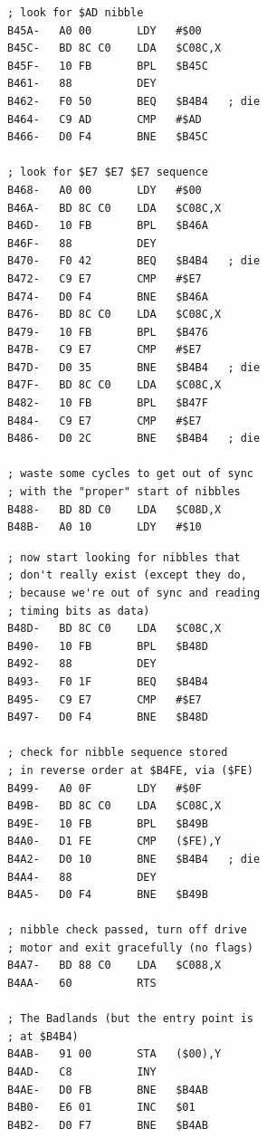 \documentclass{article}
\begin{document}
\begin{verbatim}
; look for $AD nibble
B45A-   A0 00       LDY   #$00
B45C-   BD 8C C0    LDA   $C08C,X
B45F-   10 FB       BPL   $B45C
B461-   88          DEY
B462-   F0 50       BEQ   $B4B4   ; die
B464-   C9 AD       CMP   #$AD
B466-   D0 F4       BNE   $B45C

; look for $E7 $E7 $E7 sequence
B468-   A0 00       LDY   #$00
B46A-   BD 8C C0    LDA   $C08C,X
B46D-   10 FB       BPL   $B46A
B46F-   88          DEY
B470-   F0 42       BEQ   $B4B4   ; die
B472-   C9 E7       CMP   #$E7
B474-   D0 F4       BNE   $B46A
B476-   BD 8C C0    LDA   $C08C,X
B479-   10 FB       BPL   $B476
B47B-   C9 E7       CMP   #$E7
B47D-   D0 35       BNE   $B4B4   ; die
B47F-   BD 8C C0    LDA   $C08C,X
B482-   10 FB       BPL   $B47F
B484-   C9 E7       CMP   #$E7
B486-   D0 2C       BNE   $B4B4   ; die

; waste some cycles to get out of sync
; with the "proper" start of nibbles
B488-   BD 8D C0    LDA   $C08D,X
B48B-   A0 10       LDY   #$10
\end{verbatim}

\newpage

\begin{verbatim}
; now start looking for nibbles that
; don't really exist (except they do,
; because we're out of sync and reading
; timing bits as data)
B48D-   BD 8C C0    LDA   $C08C,X
B490-   10 FB       BPL   $B48D
B492-   88          DEY
B493-   F0 1F       BEQ   $B4B4
B495-   C9 E7       CMP   #$E7
B497-   D0 F4       BNE   $B48D

; check for nibble sequence stored
; in reverse order at $B4FE, via ($FE)
B499-   A0 0F       LDY   #$0F
B49B-   BD 8C C0    LDA   $C08C,X
B49E-   10 FB       BPL   $B49B
B4A0-   D1 FE       CMP   ($FE),Y
B4A2-   D0 10       BNE   $B4B4   ; die
B4A4-   88          DEY
B4A5-   D0 F4       BNE   $B49B

; nibble check passed, turn off drive
; motor and exit gracefully (no flags)
B4A7-   BD 88 C0    LDA   $C088,X
B4AA-   60          RTS

; The Badlands (but the entry point is
; at $B4B4)
B4AB-   91 00       STA   ($00),Y
B4AD-   C8          INY
B4AE-   D0 FB       BNE   $B4AB
B4B0-   E6 01       INC   $01
B4B2-   D0 F7       BNE   $B4AB
\end{verbatim}

\newpage
\end{document}
